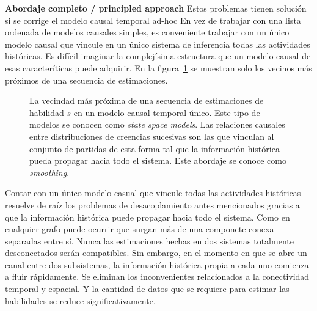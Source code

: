 \documentclass[article]{jss}
\begin{document}

\textbf{Abordaje completo / principled approach}
%
Estos problemas tienen solución si se corrige el modelo causal temporal ad-hoc
%
En vez de trabajar con una lista ordenada de modelos causales simples, es conveniente trabajar con un único modelo causal que vincule en un único sistema de inferencia todas las actividades históricas.
%
Es difícil imaginar la complejísima estructura que un modelo causal de esas caracteríticas puede adquirir.
%
En la figura~\ref{fig:smoothing} se muestran solo los vecinos más próximos de una secuencia de estimaciones.
%
\begin{figure}[h!]
  \centering
  \caption{La vecindad más próxima de una secuencia de estimaciones de habilidad $s$ en un modelo causal temporal único.
  Este tipo de modelos se conocen como \emph{state space models}.  
  Las relaciones causales entre distribuciones de creencias sucesivas son las que vinculan al conjunto de partidas de esta forma tal que la información histórica pueda propagar hacia todo el sistema.
  Este abordaje se conoce como \emph{smoothing}.
  }
  \label{fig:smoothing}
\end{figure}
%
Contar con un único modelo casual que vincule todas las actividades históricas resuelve de raíz los problemas de desacoplamiento antes mencionados gracias a que la información histórica puede propagar hacia todo el sistema.
%
Como en cualquier grafo puede ocurrir que surgan más de una componete conexa separadas entre sí.
%
Nunca las estimaciones hechas en dos sistemas totalmente desconectados serán
compatibles.
%
Sin embargo, en el momento en que se abre un canal entre dos subsistemas, la información histórica propia a cada uno comienza a fluir rápidamente.
%
Se eliminan los inconvenientes relacionados a la conectividad temporal y espacial.
%
Y la cantidad de datos que se requiere para estimar las habilidades se reduce significativamente.
\end{document}
